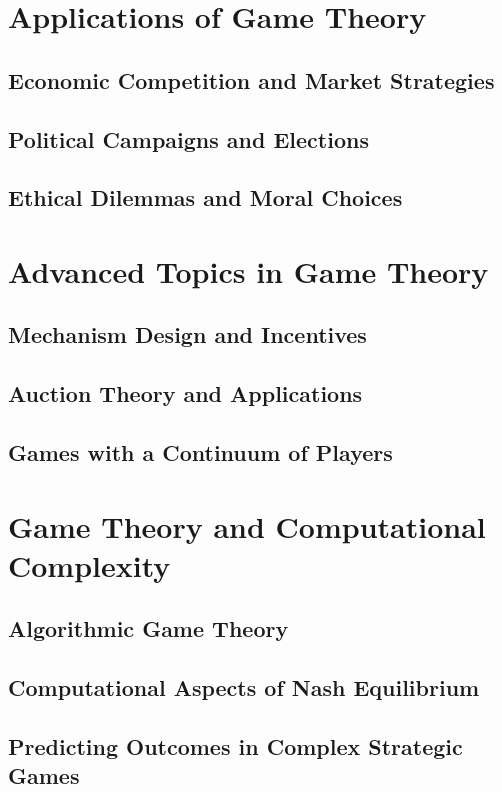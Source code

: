 \documentclass[12pt]{book} %
\begin{document}
\section{Applications of Game Theory}
\subsection{Economic Competition and Market Strategies}
\subsection{Political Campaigns and Elections}
\subsection{Ethical Dilemmas and Moral Choices}

\section{Advanced Topics in Game Theory}
\subsection{Mechanism Design and Incentives}
\subsection{Auction Theory and Applications}
\subsection{Games with a Continuum of Players}

\section{Game Theory and Computational Complexity}
\subsection{Algorithmic Game Theory}
\subsection{Computational Aspects of Nash Equilibrium}
\subsection{Predicting Outcomes in Complex Strategic Games}
\end{document}
